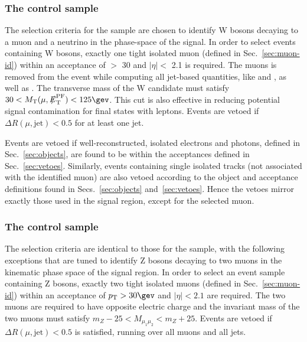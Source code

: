 \subsubsection{The \texorpdfstring{\mj}{muon + jets} control sample}
\label{sec:mucontrolSelection}

The selection criteria for the \mj sample are chosen to identify W
bosons decaying to a muon and a neutrino in the phase-space of the
signal. In order to select events containing W bosons, exactly one
tight isolated muon (defined in Sec.~\ref{sec:muon-id}) within an
acceptance of \PT $>$ 30 \gev and $|\eta| <$ 2.1 is required. The
muons is removed from the event while computing all jet-based
quantities, like \mht and \alphat, as well as \ETmiss. The transverse
mass of the W candidate must satisfy $30 < \mt(\mu,\pfmet) < 125\gev$.
This cut is also effective in reducing potential signal contamination
for final states with leptons.  Events are vetoed if $\Delta
R(\mu,\textrm{jet}) < 0.5$ for at least one jet.

Events are vetoed if well-reconstructed, isolated electrons and
photons, defined in Sec.~\ref{sec:objects}, are found to be within the
acceptances defined in Sec.~\ref{sec:vetoes}. Similarly, events
containing single isolated tracks (not associated with the identified
muon) are also vetoed according to the object and acceptance
definitions found in Secs.~\ref{sec:objects}
and~\ref{sec:vetoes}. Hence the vetoes mirror exactly those used in
the signal region, except for the selected muon.

\subsubsection{The \texorpdfstring{\mmj}{di-muon + jets} control sample}
\label{sec:mumucontrolSelection}

The selection criteria are identical to those for the \mj sample, with
the following exceptions that are tuned to identify Z bosons decaying
to two muons in the kinematic phase space of the signal region.  In
order to select an event sample containing Z bosons, exactly two tight
isolated muons (defined in Sec.~\ref{sec:muon-id}) within an
acceptance of $\Pt > 30\gev$ and $|\eta| < 2.1$ are required. The two
muons are required to have opposite electric charge and the invariant
mass of the two muons must satisfy $m_{Z} - 25 < M_{\mu_1\mu_2} <
m_{Z} +25$.  Events are vetoed if $\Delta R(\mu,\textrm{jet}) < 0.5$
is satisfied, running over all muons and all jets.

